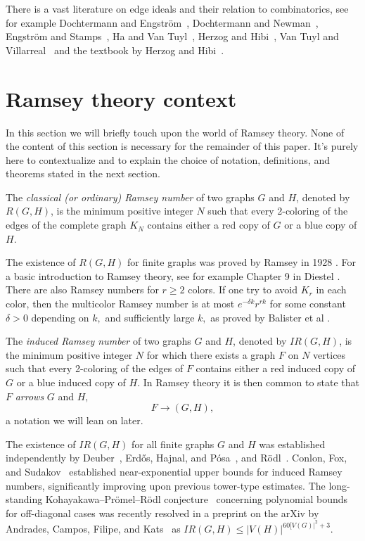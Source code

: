 \documentclass{article}
\theoremstyle{plain}
\theoremstyle{definition}
\begin{document}
There is a vast literature on edge ideals and their relation to combinatorics, see for example Dochtermann and Engstr\"om~\cite{dochtermann2009}, Dochtermann and Newman~\cite{dochtermann2023}, Engstr\"om and Stamps~\cite{engstrom2013}, Ha and Van Tuyl~\cite{ha2008}, Herzog and Hibi~\cite{herzog1999}, Van Tuyl and Villarreal~\cite{vantuyl2008} and the textbook by Herzog and Hibi~\cite{herzog2011}.

\section{Ramsey theory context}
In this section we will briefly touch upon the world of Ramsey theory. None of the content of this section is necessary for the remainder of this paper. It's purely here to contextualize and to explain the choice of notation, definitions, and theorems stated in the next section.

The \emph{classical (or ordinary) Ramsey number} of two graphs $G$ and $H$, denoted by $R(G, H)$, is the minimum positive integer $N$ such that every 2-coloring of the edges of the complete graph $K_N$ contains either a red copy of $G$ or a blue copy of $H$.

The existence of $R(G,H)$ for finite graphs was proved by Ramsey in 1928 \cite{ramsey1930}. For a basic introduction to Ramsey theory, see for example Chapter 9 in Diestel \cite{diestel2025}. There are also Ramsey numbers for $r\geq 2$ colors. If one try to avoid $K_r$ in each color, then the multicolor Ramsey number is at most $e^{-\delta k}r^{rk}$ for some constant $\delta>0$ depending on $k,$ and sufficiently large $k,$ as proved by Balister et al \cite{balister2026}.

The \emph{induced Ramsey number} of two graphs $G$ and $H$, denoted by $IR(G, H)$, is the minimum positive integer $N$ for which there exists a graph $F$ on $N$ vertices such that every 2-coloring of the edges of $F$ contains either a red induced copy of $G$ or a blue induced copy of $H$. In Ramsey theory it is then common to state that $F$ \emph{arrows} $G$ and $H,$
\[ F \rightarrow (G,H), \]
a notation we will lean on later.

The existence of $IR(G,H)$ for all finite graphs $G$ and $H$ was established independently by Deuber~\cite{deuber1975}, Erd\H{o}s, Hajnal, and P\'osa~\cite{erdos1975}, and R\"odl~\cite{rodl1973}.
Conlon, Fox, and Sudakov~\cite{conlon2010} established near-exponential upper bounds for induced Ramsey numbers, significantly improving upon previous tower-type estimates.
The long-standing Kohayakawa--Pr\"omel--R\"odl conjecture~\cite{kohayakawa1998} concerning polynomial bounds for off-diagonal cases was recently resolved in a preprint on the arXiv by Andrades, Campos, Filipe, and Kats~\cite{andrades2026} as $IR(G,H) \leq |V(H) | ^ { 60 [V(G) |^2 +3 }.$
\end{document}
